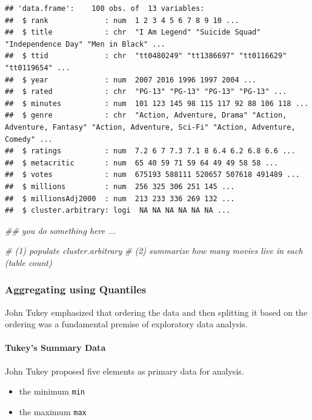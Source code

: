 \documentclass[
]{article}
\newenvironment{Shaded}{\begin{snugshade}}{\end{snugshade}}
\newcommand{\CommentTok}[1]{\textcolor[rgb]{0.56,0.35,0.01}{\textit{#1}}}
\providecommand{\tightlist}{%
  \setlength{\itemsep}{0pt}\setlength{\parskip}{0pt}}
\begin{document}
\begin{verbatim}
## 'data.frame':    100 obs. of  13 variables:
##  $ rank             : num  1 2 3 4 5 6 7 8 9 10 ...
##  $ title            : chr  "I Am Legend" "Suicide Squad" "Independence Day" "Men in Black" ...
##  $ ttid             : chr  "tt0480249" "tt1386697" "tt0116629" "tt0119654" ...
##  $ year             : num  2007 2016 1996 1997 2004 ...
##  $ rated            : chr  "PG-13" "PG-13" "PG-13" "PG-13" ...
##  $ minutes          : num  101 123 145 98 115 117 92 88 106 118 ...
##  $ genre            : chr  "Action, Adventure, Drama" "Action, Adventure, Fantasy" "Action, Adventure, Sci-Fi" "Action, Adventure, Comedy" ...
##  $ ratings          : num  7.2 6 7 7.3 7.1 8 6.4 6.2 6.8 6.6 ...
##  $ metacritic       : num  65 40 59 71 59 64 49 49 58 58 ...
##  $ votes            : num  675193 588111 520657 507618 491489 ...
##  $ millions         : num  256 325 306 251 145 ...
##  $ millionsAdj2000  : num  213 233 336 269 132 ...
##  $ cluster.arbitrary: logi  NA NA NA NA NA NA ...
\end{verbatim}

\begin{Shaded}
\begin{Highlighting}[]
\CommentTok{\#\# you do something here ... }

\CommentTok{\# (1) populate cluster.arbitrary}
\CommentTok{\# (2) summarize how many movies live in each (table count)}
\end{Highlighting}
\end{Shaded}

\hypertarget{aggregating-using-quantiles}{%
\subsubsection{Aggregating using
Quantiles}\label{aggregating-using-quantiles}}

John Tukey emphasized that ordering the data and then splitting it based
on the ordering was a fundamental premise of exploratory data analysis.

\hypertarget{tukeys-summary-data}{%
\paragraph{Tukey's Summary Data}\label{tukeys-summary-data}}

John Tukey proposed five elements as primary data for analysis.

\begin{itemize}
\tightlist
\item
  the minimum \texttt{min}
\item
  the maximum \texttt{max}
\end{itemize}
\end{document}
